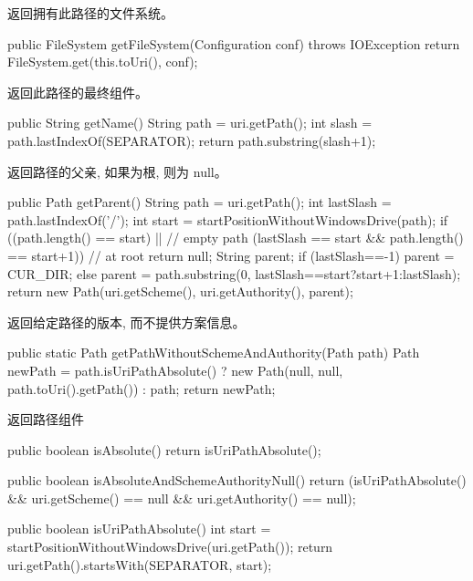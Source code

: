 返回拥有此路径的文件系统。
\begin{java}
public FileSystem getFileSystem(Configuration conf) throws IOException {
  return FileSystem.get(this.toUri(), conf);
}
\end{java}
返回此路径的最终组件。
\begin{java}
public String getName() {
  String path = uri.getPath();
  int slash = path.lastIndexOf(SEPARATOR);
  return path.substring(slash+1);
}
\end{java}
返回路径的父亲, 如果为根, 则为 null。
\begin{java}
public Path getParent() {
  String path = uri.getPath();
  int lastSlash = path.lastIndexOf('/');
  int start = startPositionWithoutWindowsDrive(path);
  if ((path.length() == start) ||               // empty path
      (lastSlash == start && path.length() == start+1)) { // at root
    return null;
  }
	String parent;
  if (lastSlash==-1) {
    parent = CUR_DIR;
  } else {
    parent = path.substring(0, lastSlash==start?start+1:lastSlash);
  }
  return new Path(uri.getScheme(), uri.getAuthority(), parent);
}
\end{java}
返回给定路径的版本, 而不提供方案信息。
\begin{java}
public static Path getPathWithoutSchemeAndAuthority(Path path) {
  Path newPath = path.isUriPathAbsolute() ?
    new Path(null, null, path.toUri().getPath()) :
    path;
  return newPath;
}
\end{java}
返回路径组件
\begin{java}
public boolean isAbsolute() {
   return isUriPathAbsolute();
}
\end{java}
\begin{java}
public boolean isAbsoluteAndSchemeAuthorityNull() {
  return  (isUriPathAbsolute() &&
      uri.getScheme() == null && uri.getAuthority() == null);
}
\end{java}
\begin{java}
public boolean isUriPathAbsolute() {
  int start = startPositionWithoutWindowsDrive(uri.getPath());
  return uri.getPath().startsWith(SEPARATOR, start);
}
\end{java}

